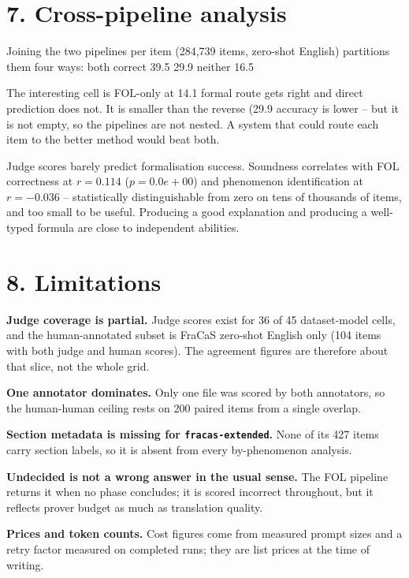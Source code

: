 \documentclass[11pt]{article}
\begin{document}
\section{7. Cross-pipeline analysis}

Joining the two pipelines per item (284,739 items, zero-shot
English) partitions them four ways: both correct
39.5%
29.9%
neither 16.5%

The interesting cell is FOL-only at 14.1%
formal route gets right and direct prediction does not. It is smaller than
the reverse (29.9%
accuracy is lower -- but it is not empty, so the pipelines are not nested.
A system that could route each item to the better method would beat both.

Judge scores barely predict formalisation success. Soundness correlates
with FOL correctness at $r=0.114$
($p=0.0e+00$) and phenomenon
identification at $r=-0.036$ --
statistically distinguishable from zero on tens of thousands of items, and
too small to be useful. Producing a good explanation and producing a
well-typed formula are close to independent abilities.

\section{8. Limitations}

\textbf{Judge coverage is partial.} Judge scores exist for 36 of 45
dataset-model cells, and the human-annotated subset is FraCaS zero-shot
English only (104 items with both judge and human
scores). The agreement figures are therefore about that slice, not the
whole grid.

\textbf{One annotator dominates.} Only one file was scored by both annotators,
so the human-human ceiling rests on 200 paired
items from a single overlap.

\textbf{Section metadata is missing for \texttt{fracas-extended}.} None of its 427
items carry section labels, so it is absent from every by-phenomenon
analysis.

\textbf{Undecided is not a wrong answer in the usual sense.} The FOL pipeline
returns it when no phase concludes; it is scored incorrect throughout, but
it reflects prover budget as much as translation quality.

\textbf{Prices and token counts.} Cost figures come from measured prompt sizes
and a retry factor measured on completed runs; they are list prices at the
time of writing.
\end{document}
